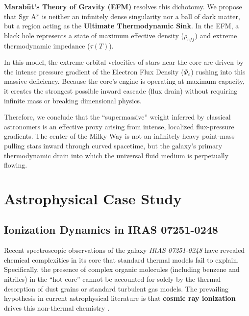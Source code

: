 \documentclass[11pt, a4paper]{article}
\begin{document}
\textbf{Marab\={u}t's Theory of Gravity (EFM)} resolves this dichotomy. We propose that Sgr A* is neither an infinitely dense singularity nor a ball of dark matter, but a region acting as the \textbf{Ultimate Thermodynamic Sink}. In the EFM, a black hole represents a state of maximum effective density ($\rho_{eff}$) and extreme thermodynamic impedance ($\tau(T)$). 

In this model, the extreme orbital velocities of stars near the core are driven by the intense pressure gradient of the Electron Flux Density ($\Phi_e$) rushing into this massive deficiency. Because the core's engine is operating at maximum capacity, it creates the strongest possible inward cascade (flux drain) without requiring infinite mass or breaking dimensional physics. 

Therefore, we conclude that the ``supermassive'' weight inferred by classical astronomers is an effective proxy arising from intense, localized flux-pressure gradients. The center of the Milky Way is not an infinitely heavy point-mass pulling stars inward through curved spacetime, but the galaxy's primary thermodynamic drain into which the universal fluid medium is perpetually flowing.

\clearpage
\section{Astrophysical Case Study}

\subsection{Ionization Dynamics in IRAS 07251-0248}

Recent spectroscopic observations of the galaxy \textit{IRAS 07251-0248} have revealed chemical complexities in its core that standard thermal models fail to explain. Specifically, the presence of complex organic molecules (including benzene and nitriles) in the ``hot core'' cannot be accounted for solely by the thermal desorption of dust grains or standard turbulent gas models. The prevailing hypothesis in current astrophysical literature is that \textbf{cosmic ray ionization} drives this non-thermal chemistry \cite{garcia2026, speranza2025}.
\end{document}
